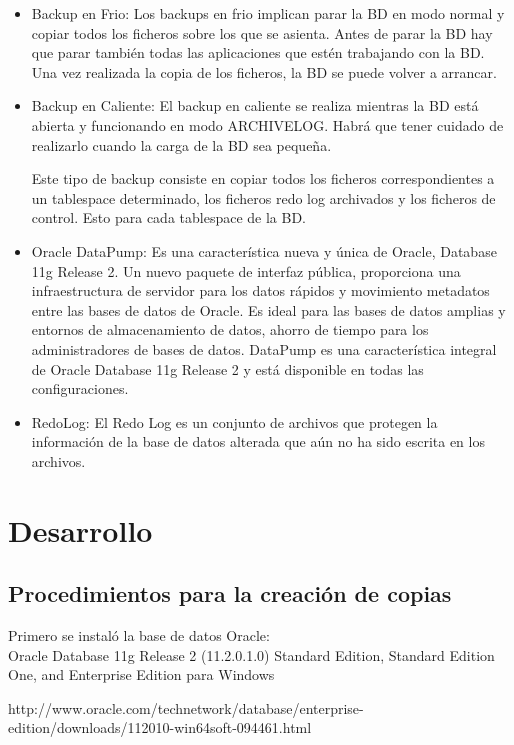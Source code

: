 \documentclass[a4paper,openright,12pt]{book}
\begin{document}
\begin{itemize}
 \item Backup en Frio: Los backups en frio implican parar la BD en modo normal y copiar todos los ficheros sobre los que se asienta. Antes de parar la BD hay que parar también todas las aplicaciones que estén trabajando con la BD. Una vez realizada la copia de los ficheros, la BD se puede volver a arrancar.

 \item Backup en Caliente: El backup en caliente se realiza mientras la BD está abierta y funcionando en modo ARCHIVELOG. Habrá que tener cuidado de realizarlo cuando la carga de la BD sea pequeña.

Este tipo de backup consiste en copiar todos los ficheros correspondientes a un tablespace determinado, los ficheros redo log archivados y los ficheros de control. Esto para cada tablespace de la BD.

 \item Oracle DataPump: Es una característica nueva y única de Oracle, Database 11g Release 2. Un nuevo paquete de interfaz pública, proporciona una infraestructura de servidor para los datos rápidos y movimiento metadatos entre las bases de datos de Oracle. Es ideal para las bases de datos amplias y entornos de almacenamiento de datos, ahorro de tiempo para los administradores de bases de datos. DataPump es una característica integral de Oracle Database 11g Release 2 y está disponible en todas las configuraciones.

 \item RedoLog: El Redo Log es un conjunto de archivos que protegen la información de la base de datos alterada que aún no ha sido escrita en los archivos.

\end{itemize}


\section{Desarrollo}\label{se:EPIS}
\subsection{Procedimientos para la creación de copias}
Primero se instaló la base de datos Oracle:\\
Oracle Database 11g Release 2 (11.2.0.1.0)
Standard Edition, Standard Edition One, and Enterprise Edition para Windows

http://www.oracle.com/technetwork/database/enterprise-edition/downloads/112010-win64soft-094461.html
\end{document}
